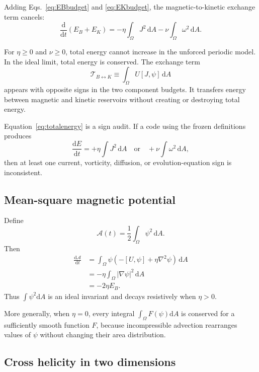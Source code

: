 \documentclass[11pt]{article}
\newcommand{\dd}{\mathrm{d}}
\begin{document}
Adding Eqs.~\eqref{eq:EBbudget} and \eqref{eq:EKbudget}, the magnetic-to-kinetic exchange term cancels:
\begin{equation}
\boxed{
\frac{\dd}{\dd t}(E_B+E_K)
=-\eta\int_\Omega J^2\,\dd A
-\nu\int_\Omega\omega^2\,\dd A.}
\label{eq:totalenergy}
\end{equation}

For $\eta\ge0$ and $\nu\ge0$, total energy cannot increase in the unforced periodic model. In the ideal limit, total energy is conserved. The exchange term
\begin{equation}
\mathcal{T}_{B\leftrightarrow K}
\equiv\int_\Omega U[J,\psi]\,\dd A
\end{equation}
appears with opposite signs in the two component budgets. It transfers energy between magnetic and kinetic reservoirs without creating or destroying total energy.

\begin{conventionbox}
Equation~\eqref{eq:totalenergy} is a sign audit. If a code using the frozen definitions produces
\[
\frac{\dd E}{\dd t}=+\eta\int J^2\,\dd A
\quad\text{or}\quad
+\nu\int\omega^2\,\dd A,
\]
then at least one current, vorticity, diffusion, or evolution-equation sign is inconsistent.
\end{conventionbox}

\subsection{Mean-square magnetic potential}

Define
\begin{equation}
\mathcal{A}(t)=\frac{1}{2}\int_\Omega\psi^2\,\dd A.
\end{equation}
Then
\begin{align}
\frac{\dd\mathcal{A}}{\dd t}
&=\int_\Omega\psi\left(-[U,\psi]+\eta\nabla^2\psi\right)\,\dd A\\
&=-\eta\int_\Omega|\nabla\psi|^2\,\dd A\\
&=-2\eta E_B.
\label{eq:Asquared}
\end{align}
Thus $\int\psi^2\dd A$ is an ideal invariant and decays resistively when $\eta>0$.

More generally, when $\eta=0$, every integral $\int_\Omega F(\psi)\dd A$ is conserved for a sufficiently smooth function $F$, because incompressible advection rearranges values of $\psi$ without changing their area distribution.

\subsection{Cross helicity in two dimensions}
\end{document}
